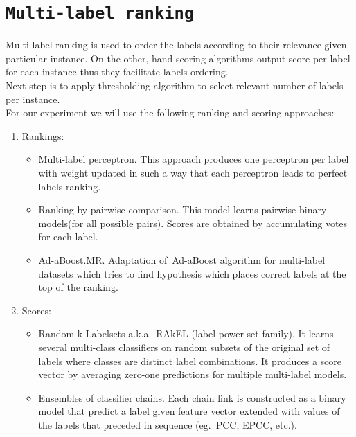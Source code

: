 \documentclass[12pt,a4paper,twocolumn]{article}
\begin{document}
\section*{\texttt{Multi-label ranking}}
Multi-label ranking is used to order the labels according to their relevance given particular instance. On the other, hand scoring algorithms output score per label for each instance thus they facilitate labels ordering.\\
Next step is to apply thresholding algorithm to select relevant number of labels per instance.\\
For our experiment we will use the following ranking and scoring approaches:

\begin{enumerate}
\item Rankings:
	\begin{itemize}
	\item Multi-label perceptron. This approach produces one perceptron per label with weight updated in such a way that each perceptron leads to perfect labels ranking. %
	\item Ranking by pairwise comparison. This model learns pairwise binary models(for all possible pairs). Scores are obtained by accumulating votes for each label. %
	\item Ad-aBoost.MR. Adaptation of~Ad-aBoost algorithm for multi-label datasets which tries to find hypothesis which places correct labels at the top of the ranking. %
	\end{itemize}
\item Scores:
	\begin{itemize}
	\item Random k-Labelsets a.k.a.\ RAkEL (label power-set family). It learns several multi-class classifiers on random subsets of the original set of labels where classes are distinct label combinations. It produces a score vector by averaging zero-one predictions for multiple multi-label models. %
	\item Ensembles of classifier chains. Each chain link is constructed as a binary model that predict a label given feature vector extended with values of the labels that preceded in sequence (eg.\ PCC, EPCC, etc.). %
	\end{itemize}
\end{enumerate}
\end{document}
